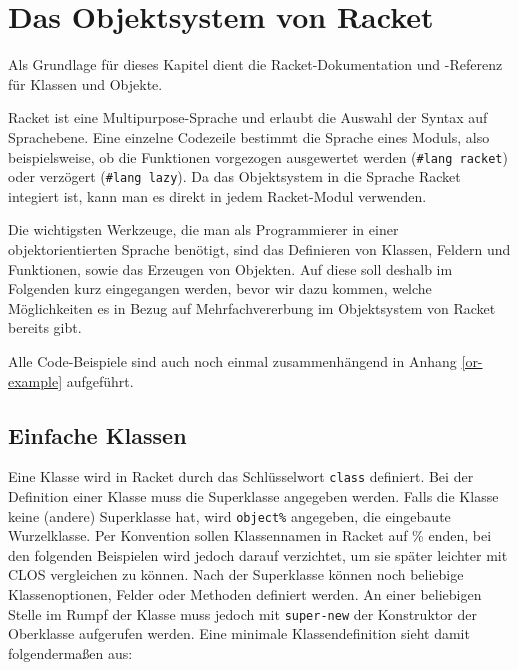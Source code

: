 
\section{Das Objektsystem von Racket}
Als Grundlage für dieses Kapitel dient die Racket-Dokumentation \cite{racketguide-classes} und -Referenz \cite{racketref-classes} für Klassen und Objekte.

Racket ist eine Multipurpose-Sprache und erlaubt die Auswahl der Syntax auf Sprachebene. Eine einzelne Codezeile bestimmt die Sprache eines Moduls, also beispielsweise, ob die Funktionen vorgezogen ausgewertet werden (\texttt{\#lang racket}) oder verzögert (\texttt{\#lang lazy}). Da das Objektsystem in die Sprache Racket integiert ist, kann man es direkt in jedem Racket-Modul verwenden.


Die wichtigsten Werkzeuge, die man als Programmierer in einer objektorientierten Sprache benötigt, sind das Definieren von Klassen, Feldern und Funktionen, sowie das Erzeugen von Objekten. Auf diese soll deshalb im Folgenden kurz eingegangen werden, bevor wir dazu kommen, welche Möglichkeiten es in Bezug auf Mehrfachvererbung im Objektsystem von Racket bereits gibt.

Alle Code-Beispiele sind auch noch einmal zusammenhängend in Anhang \ref{or-example} aufgeführt. 

\subsection{Einfache Klassen}

Eine Klasse wird in Racket durch das Schlüsselwort \texttt{class} definiert. Bei der Definition einer Klasse muss die Superklasse angegeben werden. Falls die Klasse keine (andere) Superklasse hat, wird \texttt{object\%} angegeben, die eingebaute Wurzelklasse. Per Konvention sollen Klassennamen in Racket auf \% enden, bei den folgenden Beispielen wird jedoch darauf verzichtet, um sie später leichter mit CLOS vergleichen zu können. Nach der Superklasse können noch beliebige Klassenoptionen, Felder oder Methoden definiert werden. An einer beliebigen Stelle im Rumpf der Klasse muss jedoch mit \texttt{super-new} der Konstruktor der Oberklasse aufgerufen werden. Eine minimale Klassendefinition sieht damit folgendermaßen aus:

